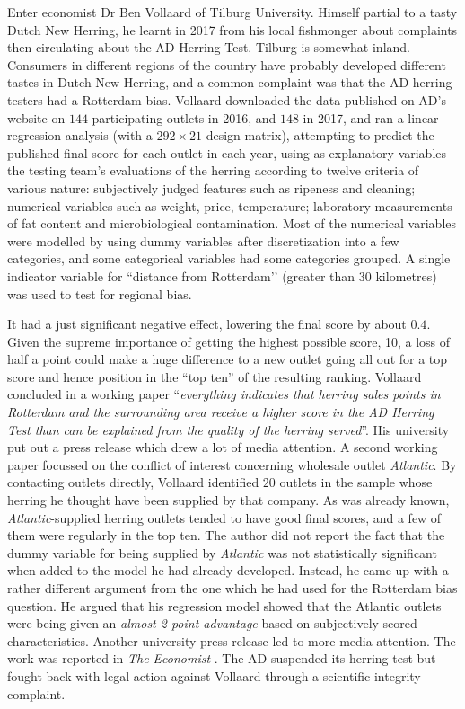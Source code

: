 \documentclass[alpha-refs]{wiley-article}
\begin{document}
Enter economist Dr Ben Vollaard of Tilburg University. Himself partial to a tasty Dutch New Herring, he learnt in 2017 from his local fishmonger about complaints then circulating about the AD Herring Test. Tilburg is somewhat inland. Consumers in different regions of the country have probably developed different tastes in Dutch New Herring, and a common complaint was that the AD herring testers had a Rotterdam bias.
Vollaard downloaded the data published on AD's website on $144$ participating outlets in 2016, and $148$ in 2017, and ran a linear regression analysis (with a $292 \times 21$ design matrix), attempting to predict the published final score for each outlet in each year, using as explanatory variables the testing team’s evaluations of the herring according to twelve criteria of various nature: subjectively judged features such as ripeness and cleaning; numerical variables such as weight, price, temperature; laboratory measurements of fat content and microbiological contamination. Most of the numerical variables were modelled by using dummy variables after discretization into a few categories, and some categorical variables had some categories grouped. A single indicator variable for ``distance from Rotterdam’’ (greater than 30 kilometres) was used to test for regional bias.

It had a just significant negative effect, lowering the final score by about $0.4$. Given the supreme importance of getting the highest possible score, 10, a loss of half a point could make a huge difference to a new outlet going all out for a top score and hence position in the ``top ten'' of the resulting ranking. 
Vollaard concluded in a working paper \citet{vollaard1} ``\emph{everything indicates that herring sales points in Rotterdam and the surrounding area receive a higher score in the AD Herring Test than can be explained from the quality of the herring served}''. His university put out a press release which drew a lot of media attention. 
A second working paper \citet{vollaard2} focussed on the conflict of interest concerning wholesale outlet \emph{Atlantic}. By contacting outlets directly, Vollaard  identified $20$ outlets in the sample whose herring he thought have been supplied by that company.  As was already known, \emph{Atlantic}-supplied herring outlets tended to have good final scores, and a few of them were regularly in the top ten. 
The author did not report the fact that the dummy variable for being supplied by \emph{Atlantic} was not statistically significant when added to the model he had already developed. Instead, he came up with a rather different argument from the one which he had used for the Rotterdam bias question. He argued that his regression model showed that the Atlantic outlets were being given an \emph{almost 2-point advantage} based on subjectively scored characteristics.  Another university press release led to more media attention. The work was reported in \emph{The Economist} \citep{vollaardEconomist2017}. The AD suspended its herring test but fought back with legal action against Vollaard through a scientific integrity complaint. 
\end{document}
